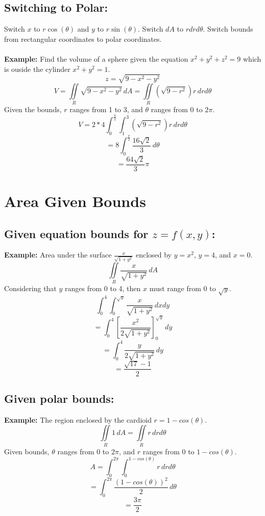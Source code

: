 \documentclass{article}
\begin{document}
\subsection{Switching to Polar:}
Switch $x$ to $r\cos(\theta)$ and $y$ to $r\sin(\theta)$. Switch $dA$ to $rdrd\theta$. Switch bounds from rectangular coordinates to polar coordinates.
\\
\\
\textbf{Example: }Find the volume of a sphere given the equation $x^2+y^2+z^2=9$ which is ouside the cylinder $x^2+y^2=1$.
\[
z=\sqrt{9-x^2-y^2}
\]
\[
V=\iint\limits_{R} \sqrt{9-x^2-y^2}\, dA = \iint\limits_{R} \left(\sqrt{9-r^2}\right) r\, drd\theta
\]
Given the bounds, $r$ ranges from 1 to 3, and $\theta$ ranges from 0 to $2\pi$.
\[
V=2*4\int_{0}^{\frac{\pi}{2}} \int_{1}^{3} \left(\sqrt{9-r^2}\right) r\, drd\theta
\]
\[
=8\int_{0}^{\frac{\pi}{2}} \frac{16\sqrt{2}}{3}\, d\theta
\]
\[
=\frac{64\sqrt{2}}{3}\pi
\]

\section{Area Given Bounds}
\subsection{Given equation bounds for $z=f(x,y)$:}
\textbf{Example: }Area under the surface $\frac{x}{\sqrt{1+y^2}}$ enclosed by $y=x^2$, $y=4$, and $x=0$.
\[
\iint\limits_{R} \frac{x}{\sqrt{1+y^2}}\, dA
\]
Considering that $y$ ranges from 0 to 4, then $x$ must range from 0 to $\sqrt{y}$.
\[
\int_{0}^{4} \int_{0}^{\sqrt{y}} \frac{x}{\sqrt{1+y^2}}\, dxdy
\]
\[
=\int_{0}^{4} \left[ \frac{x^2}{2\sqrt{1+y^2}} \right]_{0}^{\sqrt{y}}\, dy
\]
\[
=\int_{0}^{4} \frac{y}{2\sqrt{1+y^2}} \, dy
\]
\[
=\frac{\sqrt{17}-1}{2}
\]

\subsection{Given polar bounds:}
\textbf{Example: }The region enclosed by the cardioid $r=1-cos(\theta)$.
\[
\iint\limits_{R} 1\, dA = \iint\limits_{R} r\, drd\theta
\]
Given bounds, $\theta$ ranges from 0 to $2\pi$, and $r$ ranges from 0 to $1-cos(\theta)$.
\[
A=\int_{0}^{2\pi} \int_{0}^{1-cos(\theta)} r\, drd\theta
\]
\[
=\int_{0}^{2\pi} \frac{(1-cos(\theta))^2}{2}\, d\theta
\]
\[
=\frac{3\pi}{2}
\]
\end{document}
